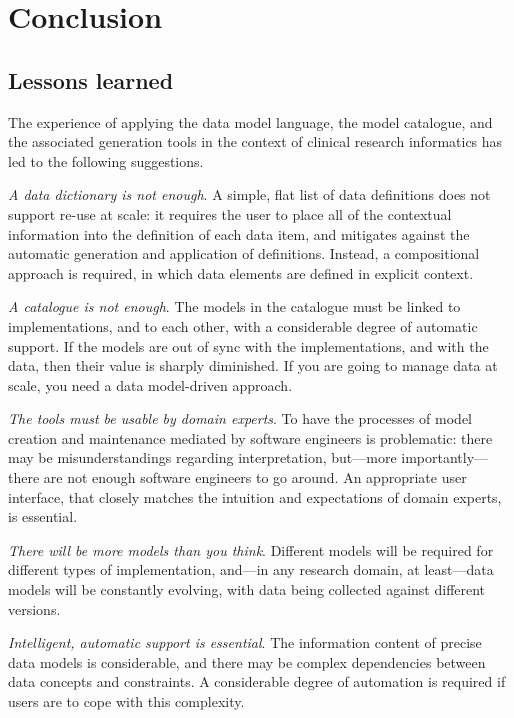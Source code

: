 
\section{Conclusion}

\subsection{Lessons learned}

The experience of applying the data model language, the model
catalogue, and the associated generation tools in the context of
clinical research informatics has led to the following suggestions.

\textsl{A data dictionary is not enough}. A simple, flat list of data
definitions does not support re-use at scale: it requires the user to
place all of the contextual information into the definition of each
data item, and mitigates against the automatic generation and
application of definitions.  Instead, a compositional approach is
required, in which data elements are defined in explicit context.

\textsl{A catalogue is not enough}.  The models in the catalogue must
be linked to implementations, and to each other, with a considerable
degree of automatic support.  If the models are out of sync with the
implementations, and with the data, then their value is sharply
diminished.  If you are going to manage data at scale, you need a data
model-driven approach. 

\textsl{The tools must be usable by domain experts}. To have the
processes of model creation and maintenance mediated by software
engineers is problematic: there may be misunderstandings regarding
interpretation, but---more importantly---there are not enough software
engineers to go around.  An appropriate user interface, that closely
matches the intuition and expectations of domain experts, is
essential.

\textsl{There will be more models than you think}.  Different models
will be required for different types of implementation, and---in any
research domain, at least---data models will be constantly evolving,
with data being collected against different versions.  

\textsl{Intelligent, automatic support is essential}. The information
content of precise data models is considerable, and there may be
complex dependencies between data concepts and constraints.  A
considerable degree of automation is required if users are to cope
with this complexity.  


